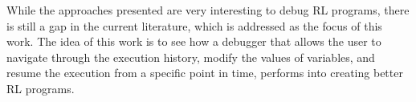 While the approaches presented are very interesting to debug \ac{RL} programs, there is still
a gap in the current literature, which is addressed as the focus of this work. The idea 
of this work is to see how 
a debugger that allows the user to navigate through the execution history, modify the values of 
variables, and resume the execution from a specific point in time, performs into creating
better \ac{RL} programs.

\endinput

